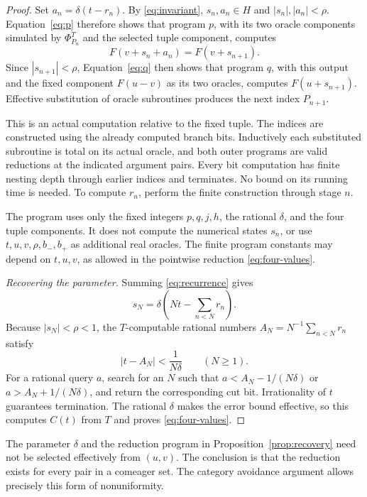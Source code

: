 \begin{proof}
Set $a_n=\delta(t-r_n)$. By \eqref{eq:invariant},
$s_n,a_n\in H$ and $|s_n|,|a_n|<\rho$. Equation~\eqref{eq:p}
therefore shows that program $p$, with its two oracle
components simulated by $\Phi_{P_n}^{T}$ and the selected
tuple component, computes
\[
F(v+s_n+a_n)=F(v+s_{n+1}).
\]
Since $|s_{n+1}|<\rho$, Equation~\eqref{eq:q} then shows
that program $q$, with this output and the fixed component
$F(u-v)$ as its two oracles, computes $F(u+s_{n+1})$.
Effective substitution of oracle subroutines produces
the next index $P_{n+1}$.

This is an actual computation relative to the fixed tuple.
The indices are constructed using the already computed
branch bits. Inductively each substituted subroutine is
total on its actual oracle, and both outer programs are
valid reductions at the indicated argument pairs. Every
bit computation has finite nesting depth through earlier
indices and terminates. No bound on its running time is
needed. To compute $r_n$, perform the finite construction
through stage $n$.

The program uses only the fixed integers $p,q,j,h$, the
rational $\delta$, and the four tuple components. It does
not compute the numerical states $s_n$, or use
$t,u,v,\rho,b_-,b_+$ as additional real oracles. The finite
program constants may depend on $t,u,v$, as allowed in the
pointwise reduction \eqref{eq:four-values}.

\medskip
\noindent\emph{Recovering the parameter.}
Summing \eqref{eq:recurrence} gives
\[
s_N=\delta\left(Nt-\sum_{n<N}r_n\right).
\]
Because $|s_N|<\rho<1$, the $T$-computable rational numbers
$A_N=N^{-1}\sum_{n<N}r_n$ satisfy
\begin{equation}\label{eq:error}
|t-A_N|<\frac{1}{N\delta}\qquad(N\ge1).
\end{equation}
For a rational query $a$, search for an $N$ such that
$a<A_N-1/(N\delta)$ or $a>A_N+1/(N\delta)$, and return
the corresponding cut bit. Irrationality of $t$ guarantees
termination. The rational $\delta$ makes the error bound
effective, so this computes $C(t)$ from $T$ and proves
\eqref{eq:four-values}.
\end{proof}

\begin{remark}\label{rem:nonuniform}
The parameter $\delta$ and the reduction program in
Proposition~\ref{prop:recovery} need not be selected
effectively from $(u,v)$. The conclusion is that the
reduction exists for every pair in a comeager set.
The category avoidance argument allows precisely this
form of nonuniformity.
\end{remark}
